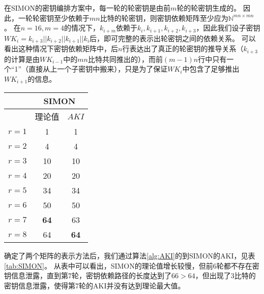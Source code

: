 在SIMON的密钥编排方案中，每一轮的轮密钥是由前$m$轮的轮密钥生成的。
因此，一轮轮密钥至少依赖于$mn$比特的轮密钥，则密钥依赖矩阵至少应为$\mathbb{N}^{mn\times mn}$。
在$n=16,m=4$的情况下，$k_{i+m}$依赖于$k_i,k_{i+1},k_{i+2},k_{i+3}$，因此我们设子密钥$WK_i=k_{i+3}||k_{i+2}||k_{i+1}||k_i$后，即可完整的表示出轮密钥之间的依赖关系。
可以看出这种情况下密钥依赖矩阵中，后$n$行表达出了真正的轮密钥的推导关系（$k_{i+3}$的计算是由$WK_{i-1}$中的$mn$比特共同推出的），而前$(m-1)n$行中只有一个“1”（直接从上一个子密钥中搬来），只是为了保证$WK_i$中包含了足够推出$WK_{i+1}$的信息。

\begin{table}[htbp]
\centering
\begin{tabular}{c|c|c}
\hline
&\multicolumn{2}{c}{SIMON}\\
\hline
&理论值&$AKI$\\
\hline
$r=1$ & 1 & 1\\
$r=2$ & 4 & 4\\
$r=3$ & 10 & 10\\
$r=4$ & 20 & 20\\
$r=5$ & 34 & 34\\
$r=6$ & 50 & 50\\
$r=7$ & \textbf{64} & 63\\
$r=8$ & 64 & \textbf{64}\\
\hline
\end{tabular}
\end{table}

确定了两个矩阵的表示方法后，我们通过算法\ref{alg:AKI}的到SIMON的AKI，见表\ref{tab:SIMON}。
从表中可以看出，SIMON的理论值增长较慢，但前6轮都不存在密钥信息泄露，直到第7轮，密钥依赖路径的长度达到了$66>64$，但出现了3比特的密钥信息泄露，使得第7轮的AKI并没有达到理论最大值。

